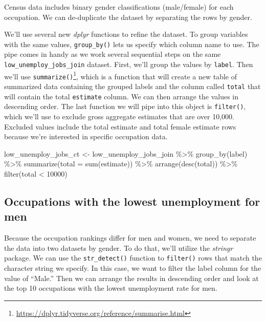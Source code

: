 \documentclass[
  krantz2]{krantz}
\makeatletter
\newenvironment{Shaded}{\begin{snugshade}}{\end{snugshade}}
\newcommand{\AttributeTok}[1]{\textcolor[rgb]{0.61,0.61,0.61}{#1}}
\newcommand{\DecValTok}[1]{\textcolor[rgb]{0.06,0.06,0.06}{#1}}
\newcommand{\FunctionTok}[1]{\textcolor[rgb]{0,0,0}{#1}}
\newcommand{\NormalTok}[1]{#1}
\newcommand{\OtherTok}[1]{\textcolor[rgb]{0.37,0.37,0.37}{#1}}
\newcommand{\SpecialCharTok}[1]{\textcolor[rgb]{0,0,0}{#1}}
\newenvironment{kframe}{%
\medskip{}
\setlength{\fboxsep}{.8em}
 \def\at@end@of@kframe{}%
 \ifinner\ifhmode%
  \def\at@end@of@kframe{\end{minipage}}%
  \begin{minipage}{\columnwidth}%
 \fi\fi%
 \def\FrameCommand##1{\hskip\@totalleftmargin \hskip-\fboxsep
 \colorbox{shadecolor}{##1}\hskip-\fboxsep
     \hskip-\linewidth \hskip-\@totalleftmargin \hskip\columnwidth}%
 \MakeFramed {\advance\hsize-\width
   \@totalleftmargin\z@ \linewidth\hsize
   \@setminipage}}%
 {\par\unskip\endMakeFramed%
 \at@end@of@kframe}
\renewenvironment{Shaded}{\begin{kframe}}{\end{kframe}}
\makeatother
\begin{document}
Census data includes binary gender classifications (male/female) for each occupation. We can de-duplicate the dataset by separating the rows by gender.

We'll use several new \emph{dplyr} functions to refine the dataset. To group variables with the same values, \texttt{group\_by()} lets us specify which column name to use. The pipe comes in handy as we work several sequential steps on the same \texttt{low\_unemploy\_jobs\_join} dataset. First, we'll group the values by \texttt{label}. Then we'll use \texttt{summarize()}\footnote{\url{https://dplyr.tidyverse.org/reference/summarise.html}}, which is a function that will create a new table of summarized data containing the grouped labels and the column called \texttt{total} that will contain the total \texttt{estimate} column. We can then arrange the values in descending order. The last function we will pipe into this object is \texttt{filter()}, which we'll use to exclude gross aggregate estimates that are over 10,000. Excluded values include the total estimate and total female estimate rows because we're interested in specific occupation data.

\begin{Shaded}
\begin{Highlighting}[]
\NormalTok{low\_unemploy\_jobs\_ct }\OtherTok{\textless{}{-}}\NormalTok{ low\_unemploy\_jobs\_join }\SpecialCharTok{\%\textgreater{}\%}
  \FunctionTok{group\_by}\NormalTok{(label) }\SpecialCharTok{\%\textgreater{}\%}
  \FunctionTok{summarize}\NormalTok{(}\AttributeTok{total =} \FunctionTok{sum}\NormalTok{(estimate)) }\SpecialCharTok{\%\textgreater{}\%}
  \FunctionTok{arrange}\NormalTok{(}\FunctionTok{desc}\NormalTok{(total)) }\SpecialCharTok{\%\textgreater{}\%}
  \FunctionTok{filter}\NormalTok{(total }\SpecialCharTok{\textless{}} \DecValTok{10000}\NormalTok{) }
\end{Highlighting}
\end{Shaded}

\hypertarget{occupations-with-the-lowest-unemployment-for-men}{%
\subsection{Occupations with the lowest unemployment for men}\label{occupations-with-the-lowest-unemployment-for-men}}

Because the occupation rankings differ for men and women, we need to separate the data into two datasets by gender. To do that, we'll utilize the \emph{stringr} package. We can use the \texttt{str\_detect()} function to \texttt{filter()} rows that match the character string we specify. In this case, we want to filter the label column for the value of ``Male.'' Then we can arrange the results in descending order and look at the top 10 occupations with the lowest unemployment rate for men.
\end{document}

